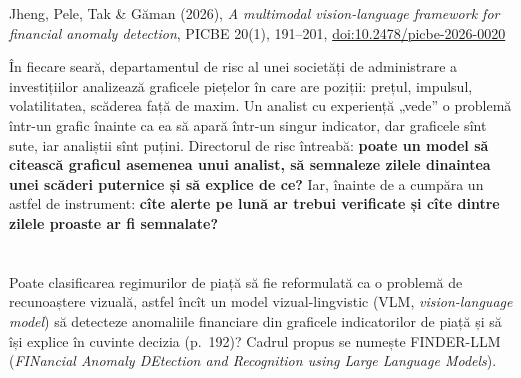 
\renewcommand{\emqacase}{\T{Research case 7 (Lecture 14)}{Studiul de caz 7 (cursul 14)}}

%
          { Jheng, Pele, Tak \& Găman (2026), \emph{A multimodal vision-language framework for financial anomaly detection},
           PICBE 20(1), 191--201, \href{https://doi.org/10.2478/picbe-2026-0020}{doi:10.2478/picbe-2026-0020}
           }

\begin{scenario}
%
{În fiecare seară, departamentul de risc al unei societăți de administrare a investițiilor analizează graficele piețelor în care are poziții: prețul, impulsul, volatilitatea, scăderea față de maxim.
Un analist cu experiență „vede” o problemă într-un grafic înainte ca ea să apară într-un singur indicator, dar graficele sînt sute, iar analiștii sînt puțini.
Directorul de risc întreabă: \textbf{poate un model să citească graficul asemenea unui analist, să semnaleze zilele dinaintea unei scăderi puternice și să explice de ce?}
Iar, înainte de a cumpăra un astfel de instrument: \textbf{cîte alerte pe lună ar trebui verificate și cîte dintre zilele proaste ar fi semnalate?}}
\end{scenario}

\section{}
\textbf{} %
{Poate clasificarea regimurilor de piață să fie reformulată ca o problemă de recunoaștere vizuală, astfel încît un model vizual-lingvistic (VLM, \emph{vision-language model}) să detecteze anomaliile financiare din graficele indicatorilor de piață și să își explice în cuvinte decizia (p.~192)? Cadrul propus se numește FINDER-LLM (\emph{FINancial Anomaly DEtection and Recognition using Large Language Models}).}

